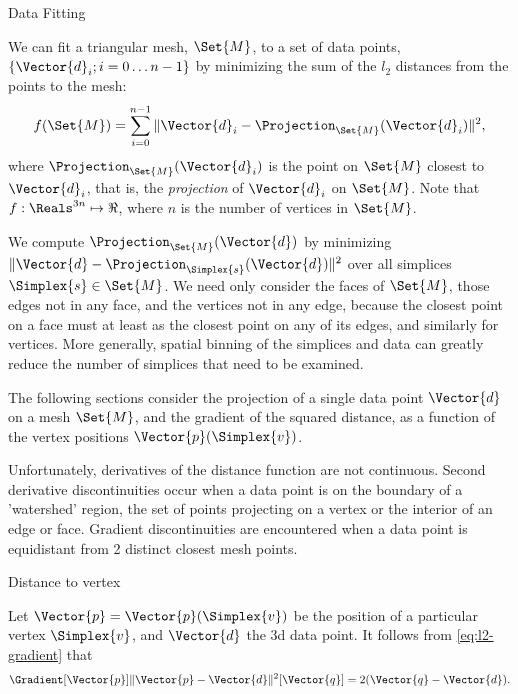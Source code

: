 \begin{plSection}{Data Fitting}
\label{sec:data-fitting}

We can fit a triangular mesh, $\Set{M}$, to a set of data points, 
$\left\{\Vector{d}_i; i=0 \ldots n-1\right\}$
by minimizing the sum of the $l_2$ distances from the points to the mesh:
\begin{equation}
f(\Set{M}) = \sum_{i=0}^{n-1} 
\|\Vector{d}_i - \Projection_{\Set{M}} (\Vector{d}_i)\|^2 ,
\end{equation}
where $\Projection_{\Set{M}} (\Vector{d}_i)$ 
is the point on $\Set{M}$ closest to $\Vector{d}_i$,
that is, the {\em projection} of $\Vector{d}_i$ on $\Set{M}$.
Note that $f:\Reals^{3n} \mapsto \Re$,
where $n$ is the number of vertices in $\Set{M}$.

We compute $\Projection_{\Set{M}} (\Vector{d})$ by minimizing  
$\|\Vector{d}-\Projection_{\Simplex{s}} (\Vector{d})\|^2$
over all simplices $\Simplex{s} \in \Set{M}$.
We need only consider the faces of $\Set{M}$,
those edges not in any face,
and the vertices not in any edge,
because the closest point on a face must at least
as the closest point on any of its edges,
and similarly for vertices.
More generally, spatial binning of the simplices and data can greatly
reduce the number of simplices that need to be examined.

The following sections consider the projection of a single
data point $\Vector{d}$ on a mesh $\Set{M}$,
and the gradient of the squared distance,
as a function of the vertex positions $\Vector{p}(\Simplex{v})$.

Unfortunately, derivatives of the distance function are not continuous.
Second derivative discontinuities occur
when a data point is on the boundary
of a 'watershed' region, the set of points
projecting on a vertex or the interior of an edge or face.
Gradient discontinuities are encountered
when a data point is equidistant from 2 distinct closest mesh points.

\begin{plSection}{Distance to vertex}
\label{sec:Distance-to-vertex}

Let $\Vector{p} = \Vector{p}(\Simplex{v})$ 
be the position of a particular vertex $\Simplex{v}$,
and $\Vector{d}$ the 3d data point.
It follows from \cref{eq:l2-gradient} that
\begin{equation}
\label{eq:vertex-distance-gradient}
\Gradient[\Vector{p}]{\|\Vector{p}-\Vector{d}\|^2}[\Vector{q}] 
= 2 ( \Vector{q}-\Vector{d} ).
\end{equation}


\end{plSection}
\end{plSection}
